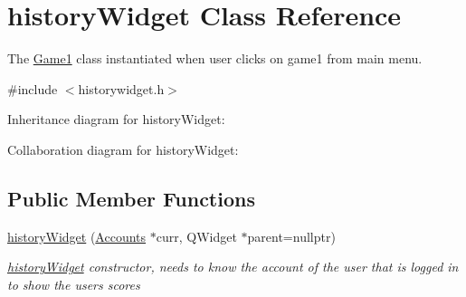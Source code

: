 \hypertarget{classhistoryWidget}{}\section{history\+Widget Class Reference}
\label{classhistoryWidget}


The \hyperlink{classGame1}{Game1} class instantiated when user clicks on game1 from main menu.  




{\ttfamily \#include $<$historywidget.\+h$>$}



Inheritance diagram for history\+Widget\+:


Collaboration diagram for history\+Widget\+:
\subsection*{Public Member Functions}
\begin{DoxyCompactItemize}
\item 
\hyperlink{classhistoryWidget_a0843e5d5c3c766bcdb3307fe00eb816a}{history\+Widget} (\hyperlink{classAccounts}{Accounts} $\ast$curr, Q\+Widget $\ast$parent=nullptr)
\begin{DoxyCompactList}\small\item\em \hyperlink{classhistoryWidget}{history\+Widget} constructor, needs to know the account of the user that is logged in to show the user\textquotesingle{}s scores \end{DoxyCompactList}\end{DoxyCompactItemize}
